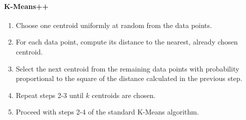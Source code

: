 \documentclass[english, threecolumn]{latex4ei/latex4ei_sheet}
\begin{document}
\begin{sectionbox}
\paragraph{K-Means++}
\begin{enumerate}
    \item Choose one centroid uniformly at random from the data points.
    \item For each data point, compute its distance to the nearest, already chosen centroid.
    \item Select the next centroid from the remaining data points with probability proportional to the square of the distance calculated in the previous step.
    \item Repeat steps 2-3 until \( k \) centroids are chosen.
    \item Proceed with steps 2-4 of the standard K-Means algorithm.
\end{enumerate}
\end{sectionbox}
\end{document}
